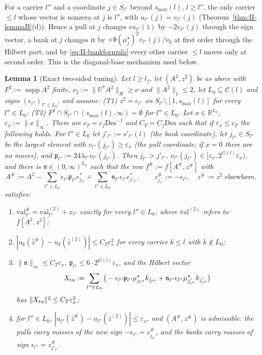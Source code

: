 \documentclass[10pt]{amsart}
\newtheorem{lemma}[theorem]{Lemma}
\theoremstyle{definition}
\theoremstyle{remark}
\newcommand{\supp}{\operatorname{supp}}
\newcommand{\R}{\mathbb R}
\newcommand{\zh}{\hat z}
\begin{document}
For a carrier $l''$ and a coordinate $j\in S_{l''}$ beyond $s_{\max}(l)$,
$l\ge l''$, the only carrier $\le l$ whose vector is nonzero at $j$ is
$l''$, with $u_{l''}(j)=v_{l''}(j)$ (Theorem~\ref{thm:II-lemmaB}(d)).
Hence a pull at $j$ changes $\epsilon u_{l''}(\zh)$ by $-2v_{l''}(j)$ through
the sign vector, a bank at $j$ changes it by $+\mathfrak b(\mu^\star_j)^2
v_{l''}(j)/\nu_0$ at first order through the Hilbert part, and by
\eqref{eq:II-bankformula} every other carrier $\le l$ moves only at second
order.  This is the diagonal-base mechanism used below.

\begin{lemma}[Exact two-sided tuning]\label{lem:II-TU}
Let $l\ge l_f$, let $(A^2,z^2)$ be as above with $F^2:=\supp A^2$ finite,
$\nu_2:=\|U^*A^2\|_H\ge\nu$ and $\|A^2\|_1\le2$, let $L_0\subseteq\mathcal C(l)$
and signs $(\epsilon_{l''})_{l''\in L_0}$, and assume:
\textup{(T1)} $z^2=\epsilon_{l''}$ on $S_{l''}\setminus[1,s_{\max}(l)]$ for
every $l''\in L_0$; \textup{(T2)} $F^2\cap S_{l''}\cap(s_{\max}(l),\infty)=
\emptyset$ for $l''\in L_0$.  Let $x\in\R^{L_0}$, $\varepsilon_x:=\|x\|_\infty$.
There are $c_T=c_f\mathrm{Des}^{-1}$ and $C_T=C_f\mathrm{Des}$ such that if
$\varepsilon_x\le c_T$ the following holds.  For $l''\in L_0$ let
$j'_{l''}:=s'_{l''}(l)$ \textup{(}the \emph{bank coordinate}\textup{)}, let
$j_{l''}\in S_{l''}$ be the largest element with $v_{l''}(j_{l''})\ge
\varepsilon_x$ \textup{(}the \emph{pull coordinate}; if $x=0$ there are no
moves\textup{)}, and $\mathfrak p_{l''}:=24\lambda_{l''}v_{l''}(j_{l''})$.  Then
$j_{l''}>j'_{l''}$, $v_{l''}(j_{l''})\in[\varepsilon_x,2^{G(l)}\varepsilon_x)$,
and there is $\mathfrak n\in(0,\infty)^{L_0}$ such that the row
$f^\#:=f[A^\#,z^\#]$ with
\[
 A^\#:=A^2-\sum_{l''\in L_0}\epsilon_{l''}\mathfrak p_{l''}e^*_{j_{l''}}+
 \sum_{l''\in L_0}\mathfrak n_{l''}\epsilon_{l''}e^*_{j'_{l''}},\qquad
 z^\#_{j_{l''}}:=-\epsilon_{l''},\quad z^\#:=z^2\text{ elsewhere},
\]
satisfies:
\begin{enumerate}
\item[(a)] $\mathrm{val}^\#_{l''}=\mathrm{val}^{(2)}_{l''}+x_{l''}$ exactly for
every $l''\in L_0$, where $\mathrm{val}^{(2)}$ refers to $f[A^2,z^2]$;
\item[(b)] $|u_k(\zh^\#)-u_k(\zh^{(2)})|\le C_T\varepsilon_x^2$ for every
carrier $k\le l$ with $k\notin L_0$;
\item[(c)] $\|\mathfrak n\|_\infty\le C_T\varepsilon_x$, $\mathfrak p_{l''}\le
6\cdot2^{G(l)}\varepsilon_x$, and the Hilbert vector
\[
 X_{\rm tu}:=\sum_{l''\in L_0}\big(-\epsilon_{l''}\mathfrak p_{l''}
 \mu^\star_{j_{l''}}k_{j_{l''}}+\mathfrak n_{l''}\epsilon_{l''}
 \mu^\star_{j'_{l''}}k_{j'_{l''}}\big)
\]
has $\|X_{\rm tu}\|^2\le C_T\varepsilon_x^2$;
\item[(d)] for $l''\in L_0$, $|u_{l''}(\zh^\#)-u_{l''}(\zh^{(2)})|\le
\varepsilon_x$, and $(A^\#,z^\#)$ is admissible: the pulls carry masses of
the new sign $-\epsilon_{l''}=z^\#_{j_{l''}}$, and the banks carry masses of
sign $\epsilon_{l''}=z^\#_{j'_{l''}}$.
\end{enumerate}
\end{lemma}
\end{document}
